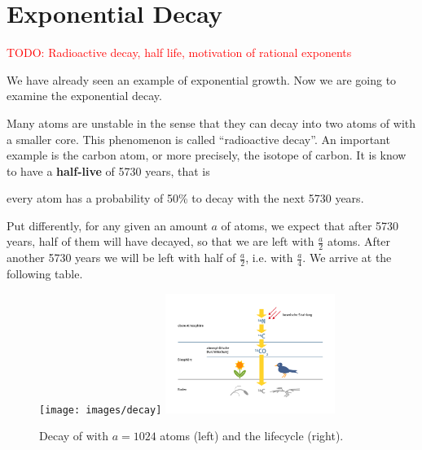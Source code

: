 \section*{Exponential Decay}
\textcolor{red}{TODO: Radioactive decay, half life, motivation of rational exponents}

We have already seen an example of exponential growth.
Now we are going to examine the exponential decay.

Many atoms are unstable in the sense that they can decay into two atoms of with a smaller core.
This phenomenon is called ``radioactive decay''.
An important example is the carbon atom, or more precisely, the  isotope of carbon.
It is know to have a \textbf{half-live} of 5730 years, that is
\begin{center}
	every  atom has a probability of 50\% to decay with the next 5730 years.
\end{center}
Put differently, for any given an amount $a$ of  atoms, we expect that after 5730 years, half of them will have decayed, so that we are left with $\frac{a}{2}$ atoms.
After another 5730 years we will be left with half of $\frac{a}{2}$, i.e. with $\frac{a}{4}$.
We arrive at the following table.
\begin{figure}[ht]
	\centering
\end{figure}
\begin{figure}[ht]
	\centering
	\texttt{[image: images/decay]}\hfill
	\includegraphics[width=0.49\textwidth]{images/c14_lifecycle}
	\caption{Decay of  with $a=1024$ atoms (left) and the  lifecycle (right).}
	\label{fig:c14}
\end{figure}